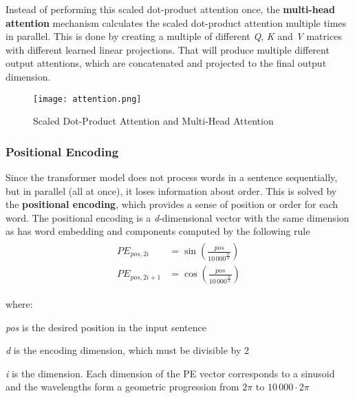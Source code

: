     Instead of performing this scaled dot-product attention once, the \textbf{multi-head attention} mechanism calculates the scaled dot-product attention multiple times in parallel. This is done by creating a multiple of different \emph{Q}, \emph{K} and \emph{V} matrices with different learned linear projections. That will produce multiple different output attentions, which are concatenated and projected to the final output dimension.
    \begin{figure}[H]
        \texttt{[image: attention.png]}
        \centering
        \caption[Scaled Dot-Product Attention and Multi-Head Attention]{Scaled Dot-Product Attention and Multi-Head Attention~\parencite{vaswani2017attention}}
        \label{fig:attention}
    \end{figure}


\subsubsection{Positional Encoding}
\label{section:pos-encoding}
    Since the transformer model does not process words in a sentence sequentially, but in parallel (all at once), it loses information about order. This is solved by the \textbf{positional encoding}, which provides a sense of position or order for each word. The positional encoding is a \emph{d}-dimensional vector with the same dimension as has word embedding and components computed by the following rule
    \begin{align} \label{equ:pos-encoding}
    \begin{split}
        PE_{pos, 2i} &= \sin(\frac{pos}{10\,000^{\frac{2i}{d}}}) \\
        PE_{pos, 2i+1} &= \cos(\frac{pos}{10\,000^{\frac{2i}{d}}})
    \end{split}
    \end{align}
    
    where:
    \begin{where}
        \item [\emph{pos}] is the desired position in the input sentence
        \item [\emph{d}] is the encoding dimension, which must be divisible by 2
        \item [\emph{i}] is the dimension. Each dimension of the PE vector corresponds to a sinusoid and the wavelengths form a geometric progression from $2\pi$ to $10\,000 \cdot 2\pi$ 
    \end{where}
    
